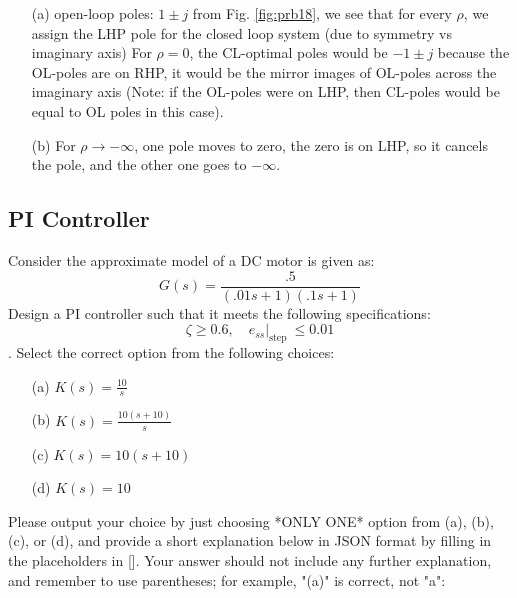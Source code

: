 \documentclass[12pt]{article}
\begin{document}
\begin{itemize}
  
\item [(a)] open-loop poles: $1 \pm j$  from Fig. \ref{fig:prb18}, we see that for every $\rho$, we assign the LHP pole for the closed loop system (due to symmetry vs imaginary axis)
For $\rho=0$, the CL-optimal poles would be $-1 \pm j$ because the OL-poles are on RHP, it would be the mirror images of OL-poles across the imaginary axis (Note: if the OL-poles were on LHP, then CL-poles would be equal to OL poles in this case).
\item [(b)] For $\rho \rightarrow -\infty$, one pole moves to zero, the zero is on LHP, so it cancels the pole, and the other one goes to $- \infty$.

\end{itemize}
\clearpage

\subsection{PI Controller}

 Consider the approximate model of a DC motor is given as: $$G(s)=\frac{.5}{(.01 s+1)(.1 s+1)}$$
 Design a PI controller such that it meets the following specifications: $$\zeta \geq 0.6,\left.\quad e_{s s}\right|_{\text {step }} \leq 0.01$$.
Select the correct option from the following choices:
\begin{enumerate}
    \item [(a)] $K(s)=\frac{10}{s}$
    \item [(b)] $K(s)=\frac{10(s+10)}{s}$
    \item [(c)] $K(s)=10(s+10)$
    \item [(d)] $K(s)=10$
\end{enumerate}

Please output your choice by just choosing *ONLY ONE* option from (a), (b), (c), or (d), and provide a short explanation below in JSON format by filling in the placeholders in []. Your answer should not include any further explanation, and remember to use parentheses; for example, "(a)" is correct, not "a": 
\end{document}

